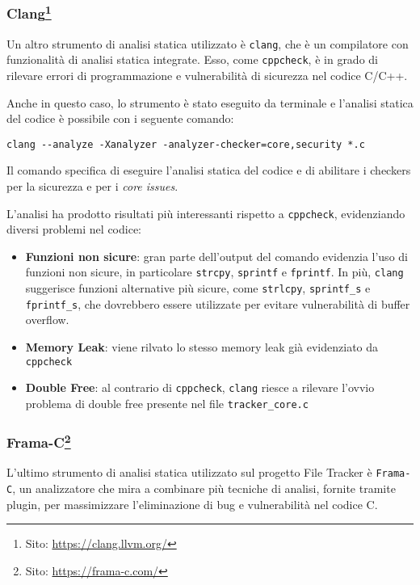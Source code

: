 \subsubsection*{\small Clang\footnote{Sito: \url{https://clang.llvm.org/}}}
Un altro strumento di analisi statica utilizzato è \texttt{clang}, che è un
compilatore con funzionalità di analisi statica integrate. Esso, come \texttt{cppcheck},
è in grado di rilevare errori di programmazione e vulnerabilità di sicurezza nel
codice C/C++.

Anche in questo caso, lo strumento è stato eseguito da terminale e l'analisi statica
del codice è possibile con i seguente comando:
\begin{lstlisting}[language={}, numbers=none]
clang --analyze -Xanalyzer -analyzer-checker=core,security *.c
\end{lstlisting}
Il comando specifica di eseguire l'analisi statica del codice e di abilitare i
checkers per la sicurezza e per i \textit{core issues}.

L'analisi ha prodotto risultati più interessanti rispetto a \texttt{cppcheck}, evidenziando
diversi problemi nel codice:
\begin{itemize}
  \item \textbf{Funzioni non sicure}: gran parte dell'output del comando evidenzia
    l'uso di funzioni non sicure, in particolare \texttt{strcpy}, \texttt{sprintf}
    e \texttt{fprintf}. In più, \texttt{clang} suggerisce funzioni alternative più
    sicure, come \texttt{strlcpy}, \texttt{sprintf\_s} e \texttt{fprintf\_s}, che
    dovrebbero essere utilizzate per evitare vulnerabilità di buffer overflow.

  \item \textbf{Memory Leak}: viene rilvato lo stesso memory leak già evidenziato
    da \texttt{cppcheck}

  \item \textbf{Double Free}: al contrario di \texttt{cppcheck}, \texttt{clang}
    riesce a rilevare l'ovvio problema di double free presente nel file \texttt{tracker\_core.c}
\end{itemize}

\medskip

\subsubsection*{\small Frama-C\footnote{Sito: \url{https://frama-c.com/}}}
L'ultimo strumento di analisi statica utilizzato sul progetto File Tracker è
\texttt{Frama-C}, un analizzatore che mira a combinare più tecniche di analisi, fornite
tramite plugin, per massimizzare l'eliminazione di bug e vulnerabilità nel
codice C.

